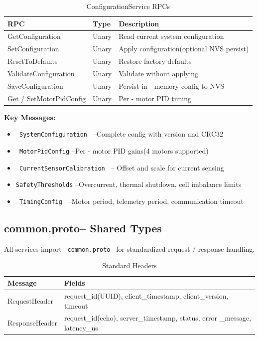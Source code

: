 \begin{table}[H]
\centering
\caption{ConfigurationService RPCs}
\label{tab:config-rpcs}
\begin{tabular} { | l | l | p{6cm} |}
\hline
\textbf{RPC} & \textbf{Type} & \textbf{Description}
\\
\hline GetConfiguration &Unary &
        Read current system configuration \\
SetConfiguration &Unary &Apply
        configuration(optional NVS persist) \\
ResetToDefaults &Unary &Restore
    factory defaults \\
ValidateConfiguration &Unary &Validate without
    applying \\
SaveConfiguration &Unary &Persist in
    - memory config to NVS \\
Get / SetMotorPidConfig &Unary &Per
    - motor PID tuning \\
\hline
\end{tabular}
\end{table}

\textbf{Key Messages:}
\begin{itemize}[leftmargin = 1.5em, topsep = 4pt, itemsep = 2pt]
    \item \texttt {
  SystemConfiguration
}
--Complete config with version and CRC32
    \item \texttt { MotorPidConfig}
--Per - motor PID gains(4 motors supported)
    \item \texttt {
  CurrentSensorCalibration
} -- Offset and scale for current sensing
    \item \texttt{SafetyThresholds}
--Overcurrent, thermal shutdown, cell imbalance limits
    \item \texttt {
  TimingConfig
}
--Motor period, telemetry period, communication timeout
\end{itemize}

\subsection{common.proto-- Shared Types}

All services import \texttt {
  common.proto
} for
  standardized request / response handling.

\begin{table}[H]
\centering
\caption{Standard Headers}
\label{tab:headers}
\begin{tabular} { | l | p{9cm} |}
\hline
\textbf{Message} & \textbf{Fields}
\\
\hline RequestHeader &request\_id(UUID), client\_timestamp, client\_version,
    timeout \\
ResponseHeader &request\_id(echo), server\_timestamp, status,
    error \_message, latency\_us \\
\hline
\end{tabular}
\end{table}

